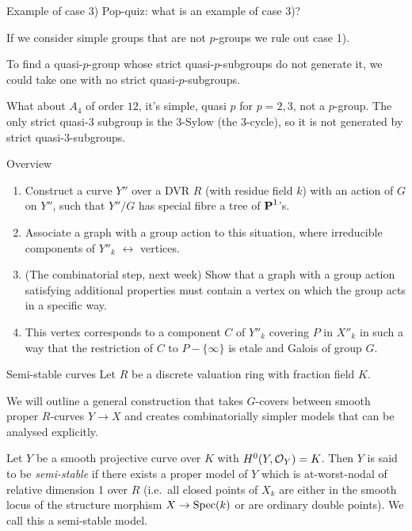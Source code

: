 \begin{frame}{Example of case 3)}
    Pop-quiz: what is an example of case 3)?\pause

    If we consider simple groups that are not $p$-groups we rule out case 1).

    To find a quasi-$p$-group whose strict quasi-$p$-subgroups do not generate it, we could take one with no strict quasi-$p$-subgroups.

    What about $A_4$ of order $12$, it's simple, quasi $p$ for $p =2,3$, not a $p$-group. The only strict quasi-$3$ subgroup is the 3-Sylow (the 3-cycle), so it is not generated by strict quasi-$3$-subgroups.
\end{frame}

\begin{frame}{Overview}
    \begin{enumerate}[<+->]
        \item Construct a curve $Y''$ over a DVR $R$ (with residue field $k$) with an action of $G$ on $Y''$, such that $Y''/G$ has special fibre a tree of $\operatorname{\mathbf {P}}^1$'s.
        \item Associate a graph with a group action to this situation, where irreducible components of $Y''_k$ $\leftrightarrow$ vertices.
        \item (The combinatorial step, next week) Show that a graph with a group action satisfying additional properties must contain a vertex on which the group acts in a specific way.
        \item This vertex corresponds to a component $C$ of $Y''_k$ covering $P$ in $X''_k$ in such a way that the restriction of $C$ to $P - \{ \infty \}$ is etale and Galois of group $G$.
    \end{enumerate}
\end{frame}

\begin{frame}{Semi-stable curves}
    Let $R$ be a discrete valuation ring with fraction field $K$.

    We will outline a general construction that takes $G$-covers between smooth proper $R$-curves $Y \to X$ and creates combinatorially simpler models that can be analysed explicitly. \pause

    \begin{definition}
        Let $Y$ be a smooth projective curve over $K$ with $H^0(Y,\operatorname{\mathcal{O}}_Y)=K$. Then $Y$ is said to be \emph{semi-stable} if there exists a proper model of $Y$ which is at-worst-nodal of relative dimension 1 over $R$ (i.e.\ all closed points of $X_k$ are either in the smooth locus of the structure morphism $X\to\operatorname{Spec}(k)$ or are ordinary double points). We call this a semi-stable model.
    \end{definition}
\end{frame}

